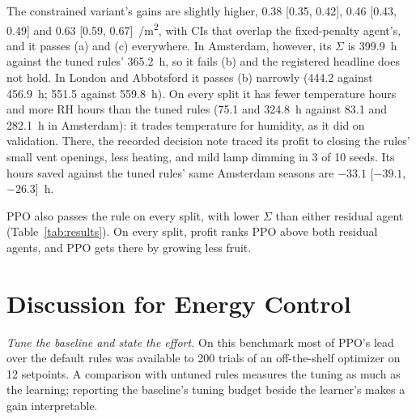 \documentclass[letterpaper]{article} %
\newcommand{\eurm}{\texteuro/m\textsuperscript{2}}
\begin{document}
The constrained variant's gains are slightly higher, 0.38 [0.35, 0.42], 0.46 [0.43, 0.49] and 0.63 [0.59, 0.67]~\eurm{}, with CIs that overlap the fixed-penalty agent's, and it passes (a) and (c) everywhere. In Amsterdam, however, its $\Sigma$ is 399.9~h against the tuned rules' 365.2~h, so it fails (b) and the registered headline does not hold. In London and Abbotsford it passes (b) narrowly (444.2 against 456.9~h; 551.5 against 559.8~h).
On every split it has fewer temperature hours and more RH hours than the tuned rules (75.1 and 324.8~h against 83.1 and 282.1~h in Amsterdam): it trades temperature for humidity, as it did on validation.
There, the recorded decision note traced its profit to closing the rules' small vent openings, less heating, and mild lamp dimming in 3 of 10 seeds.
Its hours saved against the tuned rules' same Amsterdam seasons are $-33.1$ [$-39.1$, $-26.3$]~h.

PPO also passes the rule on every split, with lower $\Sigma$ than either residual agent (Table~\ref{tab:results}). On every split, profit ranks PPO above both residual agents, and PPO gets there by growing less fruit.

\section{Discussion for Energy Control}

\emph{Tune the baseline and state the effort.} On this benchmark most of PPO's lead over the default rules was available to 200 trials of an off-the-shelf optimizer on 12 setpoints. A comparison with untuned rules measures the tuning as much as the learning; reporting the baseline's tuning budget beside the learner's makes a gain interpretable.
\end{document}
